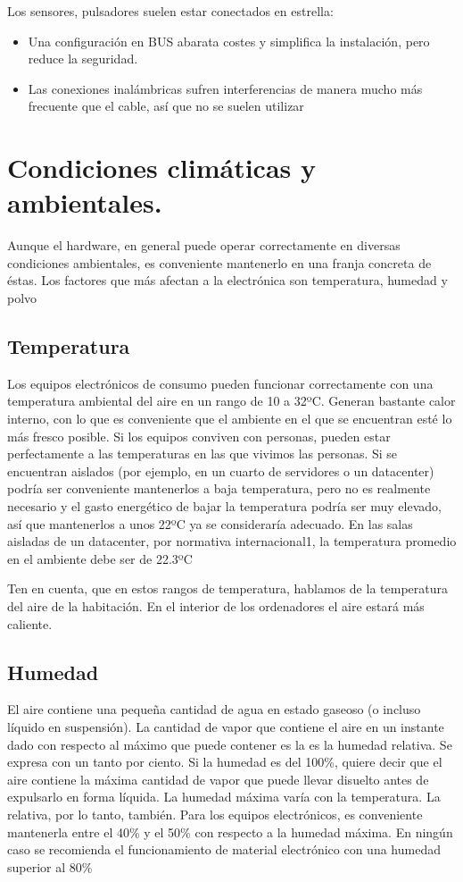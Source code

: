 \documentclass{article}
\begin{document}
Los sensores, pulsadores suelen estar conectados en estrella:
\begin{itemize}
\item Una configuración en BUS abarata costes y simplifica la instalación, pero reduce la seguridad.
\item Las conexiones inalámbricas sufren interferencias de manera mucho más frecuente que el cable, así que no se suelen utilizar
\end{itemize}

\section{Condiciones climáticas y ambientales.}
\label{sec:orga4aa687}
Aunque el hardware, en general puede operar correctamente en diversas condiciones ambientales, es conveniente mantenerlo en una franja concreta de éstas.
Los factores que más afectan a la electrónica son temperatura, humedad y polvo

\subsection{Temperatura}
\label{sec:orgb4ee951}
Los equipos electrónicos  de consumo pueden funcionar correctamente con una temperatura ambiental del aire en un rango de 10 a 32ºC.
Generan bastante calor interno, con lo que es conveniente que el ambiente en el que se encuentran esté lo más fresco posible.
Si los equipos conviven con personas, pueden estar perfectamente a las temperaturas en las que vivimos las personas.
Si se encuentran aislados (por ejemplo, en un cuarto de servidores o un datacenter) podría ser conveniente mantenerlos a baja temperatura, pero no es realmente necesario y el gasto energético de bajar la temperatura podría ser muy elevado, así que mantenerlos a unos 22ºC ya se consideraría adecuado. En las salas aisladas de un datacenter, por normativa internacional1, la temperatura promedio en el ambiente debe ser de 22.3ºC

Ten en cuenta, que en estos rangos de temperatura, hablamos de la temperatura del aire de la habitación. En el interior de los ordenadores el aire estará más caliente.

\subsection{Humedad}
\label{sec:orga692e6c}
El aire contiene una pequeña cantidad de agua en estado gaseoso (o incluso líquido en suspensión). La cantidad de vapor que contiene el aire en un instante dado con respecto al máximo que puede contener es la es la humedad relativa. Se expresa con un tanto por ciento.
Si la humedad es del 100\%, quiere decir que el aire contiene la máxima cantidad de vapor que puede llevar disuelto antes de expulsarlo en forma líquida.
La humedad máxima varía con la temperatura. La relativa, por lo tanto, también.
Para los equipos electrónicos, es conveniente mantenerla entre el 40\% y el 50\% con respecto a la humedad máxima. En ningún caso se recomienda el funcionamiento de material electrónico con una humedad superior al 80\%
\end{document}
